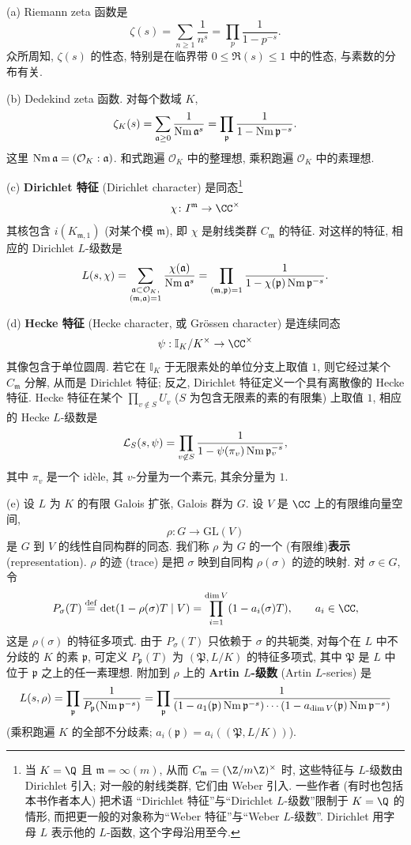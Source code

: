 \begin{example}\label{ex:vi.1.1}
(a) Riemann zeta 函数是
\[
\zeta(s)=\sum_{n\ge1}\frac{1}{n^{s}}=\prod_{p}\frac{1}{1-p^{-s}}.
\]
众所周知, $\zeta(s)$ 的性态, 特别是在临界带 $0\le\Re(s)\le1$ 中的性态, 与素数的分布有关.

(b) Dedekind zeta 函数. 对每个数域 $K$,
\[
\zeta_K(s)=\sum_{\mathfrak{a}\ge0}\frac{1}{\operatorname{Nm}\mathfrak{a}^{s}}=\prod_{\mathfrak{p}}\frac{1}{1-\operatorname{Nm}\mathfrak{p}^{-s}}.
\]
这里 $\operatorname{Nm}\mathfrak{a}=(\mathcal{O}_K:\mathfrak{a})$. 和式跑遍 $\mathcal{O}_K$ 中的整理想, 乘积跑遍 $\mathcal{O}_K$ 中的素理想.

(c) \textbf{Dirichlet 特征} (Dirichlet character) 是同态\footnote{当 $K=\Q$ 且 $\mathfrak{m}=\infty(m)$, 从而 $C_{\mathfrak{m}}=(\Z/m\Z)^{\times}$ 时, 这些特征与 $L$-级数由 Dirichlet 引入; 对一般的射线类群, 它们由 Weber 引入. 一些作者 (有时也包括本书作者本人) 把术语 ``Dirichlet 特征''与``Dirichlet $L$-级数''限制于 $K=\Q$ 的情形, 而把更一般的对象称为``Weber 特征''与``Weber $L$-级数''. Dirichlet 用字母 $L$ 表示他的 $L$-函数, 这个字母沿用至今.}
\[
\chi\colon I^{\mathfrak{m}}\to\CC^{\times}
\]
其核包含 $i(K_{\mathfrak{m},1})$ (对某个模 $\mathfrak{m}$), 即 $\chi$ 是射线类群 $C_{\mathfrak{m}}$ 的特征. 对这样的特征, 相应的 Dirichlet $L$-级数是
\[
L(s,\chi)=\sum_{\substack{\mathfrak{a}\subset\mathcal{O}_{K},\\(\mathfrak{m},\mathfrak{a})=1}}\frac{\chi(\mathfrak{a})}{\operatorname{Nm}\mathfrak{a}^{s}}=\prod_{(\mathfrak{m},\mathfrak{p})=1}\frac{1}{1-\chi(\mathfrak{p})\operatorname{Nm}\mathfrak{p}^{-s}}.
\]

(d) \textbf{Hecke 特征} (Hecke character, 或 Gr\"ossen character) 是连续同态
\[
\psi:\mathbb{I}_K/K^{\times}\to\CC^{\times}
\]
其像包含于单位圆周. 若它在 $\mathbb{I}_K$ 于无限素处的单位分支上取值 $1$, 则它经过某个 $C_{\mathfrak{m}}$ 分解, 从而是 Dirichlet 特征; 反之, Dirichlet 特征定义一个具有离散像的 Hecke 特征. Hecke 特征在某个 $\prod_{v\notin S}U_v$ ($S$ 为包含无限素的素的有限集) 上取值 $1$, 相应的 Hecke $L$-级数是
\[
{\cal L}_{S}(s,\psi)=\prod_{v\not\in S}\frac{1}{1-\psi(\pi_{v})\operatorname{Nm}\mathfrak{p}_{v}^{-s}},
\]
其中 $\pi_v$ 是一个 idèle, 其 $v$-分量为一个素元, 其余分量为 $1$.

(e) 设 $L$ 为 $K$ 的有限 Galois 扩张, Galois 群为 $G$. 设 $V$ 是 $\CC$ 上的有限维向量空间,
\[
\rho:G\to\mathrm{GL}(V)
\]
是 $G$ 到 $V$ 的线性自同构群的同态. 我们称 $\rho$ 为 $G$ 的一个 (有限维)\textbf{表示} (representation). $\rho$ 的迹 (trace) 是把 $\sigma$ 映到自同构 $\rho(\sigma)$ 的迹的映射. 对 $\sigma\in G$, 令
\[
P_{\sigma}(T)\overset{\mathrm{def}}{=}\det(1-\rho(\sigma)T\mid V)=\prod_{i=1}^{\dim V}(1-a_{i}(\sigma)T),\qquad a_{i}\in\CC,
\]
这是 $\rho(\sigma)$ 的特征多项式. 由于 $P_{\sigma}(T)$ 只依赖于 $\sigma$ 的共轭类, 对每个在 $L$ 中不分歧的 $K$ 的素 $\mathfrak{p}$, 可定义 $P_{\mathfrak{p}}(T)$ 为 $(\mathfrak{P},L/K)$ 的特征多项式, 其中 $\mathfrak{P}$ 是 $L$ 中位于 $\mathfrak{p}$ 之上的任一素理想. 附加到 $\rho$ 上的 \textbf{Artin $L$-级数} (Artin $L$-series) 是
\[
L(s,\rho)=\prod_{\mathfrak{p}}\frac{1}{P_{\mathfrak{p}}(\operatorname{Nm}\mathfrak{p}^{-s})}=\prod_{\mathfrak{p}}\frac{1}{(1-a_{1}(\mathfrak{p})\operatorname{Nm}\mathfrak{p}^{-s})\cdots(1-a_{\dim V}(\mathfrak{p})\operatorname{Nm}\mathfrak{p}^{-s})}
\]
(乘积跑遍 $K$ 的全部不分歧素; $a_i(\mathfrak{p})=a_i((\mathfrak{P},L/K))$).
\end{example}

